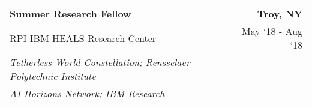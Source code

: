 \documentclass[10pt, letterpaper]{letter}
\begin{document}
        \begin{tabularx}{\textwidth}{X r}
            \textbf{Summer Research Fellow} & \textbf{Troy, 
        NY} \\
            RPI-IBM HEALS Research Center & 
        
    May ‘18 - 
    Aug ‘18 \\
            
                \textit{Tetherless World Constellation; Rensselaer Polytechnic Institute} & \\
            
                \textit{AI Horizons Network; IBM Research} & \\
            
            
        \end{tabularx}
        \vspace{-1em}
\end{document}
